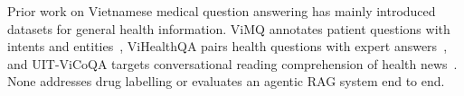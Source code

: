 Prior work on Vietnamese medical question answering has mainly introduced datasets for general health information. ViMQ annotates patient questions with intents and entities~\cite{huy2021vimq}, ViHealthQA pairs health questions with expert answers~\cite{nguyen2022spbertqa}, and UIT-ViCoQA targets conversational reading comprehension of health news~\cite{luu2021vicoqa}. None addresses drug labelling or evaluates an agentic RAG system end to end.
